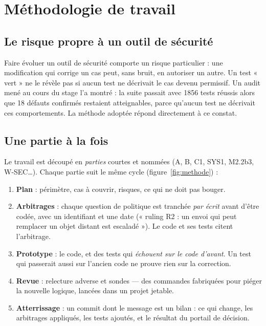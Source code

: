 \section{Méthodologie de travail}
\label{sec:methodologie}

\subsection{Le risque propre à un outil de sécurité}
Faire évoluer un outil de sécurité comporte un risque particulier : une modification qui
corrige un cas peut, sans bruit, en autoriser un autre. Un test « vert » ne le révèle pas
si aucun test ne décrivait le cas devenu permissif. Un audit mené au cours du stage l'a montré :
la suite passait avec 1856 tests réussis alors que 18 défauts confirmés restaient
atteignables, parce qu'aucun test ne décrivait ces comportements. La méthode adoptée
répond directement à ce constat.

\subsection{Une partie à la fois}
Le travail est découpé en \emph{parties} courtes et nommées (A, B, C1, SYS1, M2.2b3,
W-SEC\ldots). Chaque partie suit le même cycle (figure~\ref{fig:methode}) :

\begin{enumerate}
  \item \textbf{Plan} : périmètre, cas à couvrir, risques, ce qui ne doit pas bouger.
  \item \textbf{Arbitrages} : chaque question de politique est tranchée \emph{par écrit}
    avant d'être codée, avec un identifiant et une date (« ruling R2 : un envoi qui peut
    remplacer un objet distant est escaladé »). Le code et ses tests citent l'arbitrage.
  \item \textbf{Prototype} : le code, et des tests qui \emph{échouent sur le code d'avant}.
    Un test qui passerait aussi sur l'ancien code ne prouve rien sur la correction.
  \item \textbf{Revue} : relecture adverse et sondes --- des commandes fabriquées pour
    piéger la nouvelle logique, lancées dans un projet jetable.
  \item \textbf{Atterrissage} : un commit dont le message est un bilan : ce qui change, les
    arbitrages appliqués, les tests ajoutés, et le résultat du portail de décision.
\end{enumerate}

